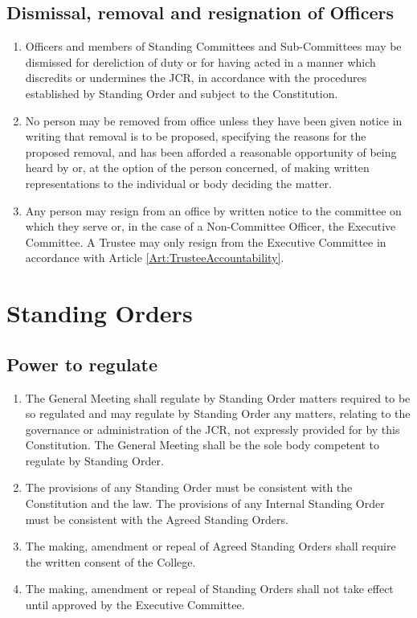 \documentclass[11pt,a4paper, oneside]{memoir}
\begin{document}
	\section{Dismissal, removal and resignation of Officers}
	\label{Art:Dismissal}
	\begin{enumerate}
		\item Officers and members of Standing Committees and Sub-Committees may be dismissed for dereliction of duty or for having acted in a manner which discredits or undermines the JCR, in accordance with the procedures established by Standing Order and subject to the Constitution.
		\item No person may be removed from office unless they have been given notice in writing that removal is to be proposed, specifying the reasons for the proposed removal, and has been afforded a reasonable opportunity of being heard by or, at the option of the person concerned, of making written representations to the individual or body deciding the matter.
		\item Any person may resign from an office by written notice to the committee on which they serve or, in the case of a Non-Committee Officer, the Executive Committee.
		A Trustee may only resign from the Executive Committee in accordance with Article \ref{Art:TrusteeAccountability}.
	\end{enumerate}
	\chapter{Standing Orders}
	\section{Power to regulate} \label{Art:SOPowers}
	\begin{enumerate}
		\item The General Meeting shall regulate by Standing Order matters required to be so regulated and may regulate by Standing Order any matters, relating to the governance or administration of the JCR, not expressly provided for by this Constitution.
		The General Meeting shall be the sole body competent to regulate by Standing Order.
		\item The provisions of any Standing Order must be consistent with the Constitution and the law.
		The provisions of any Internal Standing Order must be consistent with the Agreed Standing Orders.
		\item The making, amendment or repeal of Agreed Standing Orders shall require the written consent of the College.
		\item The making, amendment or repeal of Standing Orders shall not take effect until approved by the Executive Committee.
	\end{enumerate}
\end{document}
